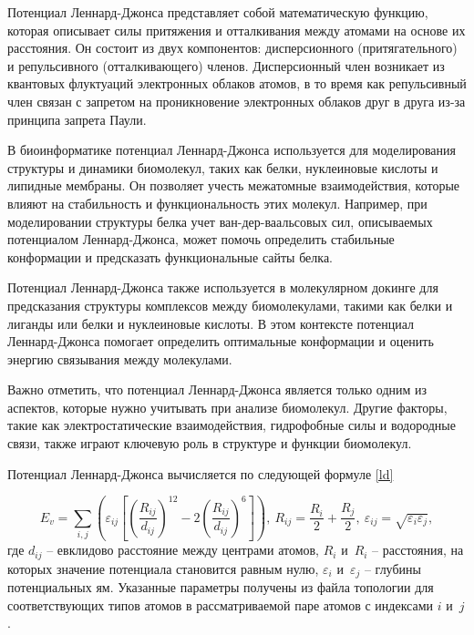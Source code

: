 Потенциал Леннард-Джонса представляет собой математическую функцию, которая описывает силы притяжения и отталкивания между атомами на основе их расстояния. Он состоит из двух компонентов: дисперсионного (притягательного) и репульсивного (отталкивающего) членов. Дисперсионный член возникает из квантовых флуктуаций электронных облаков атомов, в то время как репульсивный член связан с запретом на проникновение электронных облаков друг в друга из-за принципа запрета Паули.

В биоинформатике потенциал Леннард-Джонса используется для моделирования структуры и динамики биомолекул, таких как белки, нуклеиновые кислоты и липидные мембраны. Он позволяет учесть межатомные взаимодействия, которые влияют на стабильность и функциональность этих молекул. Например, при моделировании структуры белка учет ван-дер-ваальсовых сил, описываемых потенциалом Леннард-Джонса, может помочь определить стабильные конформации и предсказать функциональные сайты белка.

Потенциал Леннард-Джонса также используется в молекулярном докинге для предсказания структуры комплексов между биомолекулами, такими как белки и лиганды или белки и нуклеиновые кислоты. В этом контексте потенциал Леннард-Джонса помогает определить оптимальные конформации и оценить энергию связывания между молекулами.

Важно отметить, что потенциал Леннард-Джонса является только одним из аспектов, которые нужно учитывать при анализе биомолекул. Другие факторы, такие как электростатические взаимодействия, гидрофобные силы и водородные связи, также играют ключевую роль в структуре и функции биомолекул.

Потенциал Леннард-Джонса вычисляется по следующей формуле \ref{ld}

\begin{equation}
	\displaystyle E_{v}=\sum _{i,j}\left(\varepsilon_{ij}\left[\left({\frac {R_{ij}}{d_{ij}}}\right)^{12}-2\left({\frac {R_{ij}}{d_{ij}}}\right)^{6}\right]\right), \ R_{ij} = \frac{R_{i}}{2} + \frac{R_{j}}{2}, \ \varepsilon_{ij} = \sqrt{\varepsilon_{i} \varepsilon_{j}},
	\label{ld}
\end{equation}
где $d_{ij}$ -- евклидово расстояние между центрами атомов, $R_{i}$ и~$R_{i}$ -- расстояния, на которых значение потенциала становится равным нулю, $\varepsilon_{i}$ и~$\varepsilon_{j}$ -- глубины потенциальных ям. Указанные параметры получены из файла топологии для соответствующих типов атомов в рассматриваемой паре атомов с индексами $i$ и~$j$.

